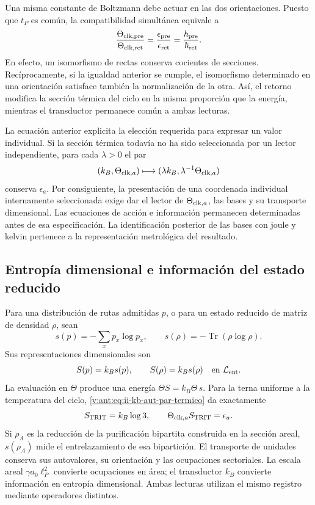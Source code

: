 Una misma constante de Boltzmann debe actuar en las dos orientaciones.
Puesto que \(t_P\) es común, la compatibilidad simultánea equivale a
\begin{equation}
 \frac{\Theta_{{\rm clk},{\rm pre}}}{\Theta_{{\rm clk},{\rm ret}}}
 =\frac{\epsilon_{\rm pre}}{\epsilon_{\rm ret}}
 =\frac{\hbar_{\rm pre}}{\hbar_{\rm ret}}.
 \label{v:ant:eq:ii-kb-aut-orientaciones}
\end{equation}
En efecto, un isomorfismo de rectas conserva cocientes de secciones.
Recíprocamente, si la igualdad anterior se cumple, el isomorfismo
determinado en una orientación satisface también la normalización de
la otra. Así, el retorno modifica la sección térmica del ciclo en la
misma proporción que la energía, mientras el transductor permanece
común a ambas lecturas.

La ecuación anterior explicita la elección requerida para expresar un
valor individual. Si la sección térmica todavía no ha sido seleccionada
por un lector independiente, para cada \(\lambda>0\) el par
\[
 (k_B,\Theta_{{\rm clk},a})
 \longmapsto(\lambda k_B,\lambda^{-1}\Theta_{{\rm clk},a})
\]
conserva \(\epsilon_a\). Por consiguiente, la presentación de una
coordenada individual internamente seleccionada exige dar el lector de
\(\Theta_{{\rm clk},a}\), las bases y su transporte dimensional.
Las ecuaciones de acción e información permanecen determinadas antes
de esa especificación. La identificación posterior de las bases con
joule y kelvin pertenece a la representación metrológica del resultado.

\subsection{Entropía dimensional e información del estado reducido}

Para una distribución de rutas admitidas \(p\), o para un estado
reducido de matriz de densidad \(\rho\), sean
\[
 s(p)=-\sum_xp_x\log p_x,\qquad
 s(\rho)=-\operatorname{Tr}(\rho\log\rho).
\]
Sus representaciones dimensionales son
\begin{equation}
 S(p)=k_Bs(p),\qquad S(\rho)=k_Bs(\rho)
 \quad\text{en }\mathcal L_{\rm ent}.
 \label{v:ant:eq:ii-kb-aut-entropia}
\end{equation}
La evaluación en \(\Theta\) produce una energía
\(\Theta S=k_B\Theta\,s\). Para la terna uniforme a la temperatura
del ciclo, \eqref{v:ant:eq:ii-kb-aut-par-termico} da exactamente
\[
 S_{\rm TRIT}=k_B\log3,\qquad
 \Theta_{{\rm clk},a}S_{\rm TRIT}=\epsilon_a.
\]
Si \(\rho_A\) es la reducción de la purificación bipartita
construida en la sección areal, \(s(\rho_A)\) mide el entrelazamiento
de esa bipartición. El transporte de unidades conserva sus
autovalores, su orientación y las ocupaciones sectoriales. La escala
areal \(\gamma a_0\ell_P^2\) convierte ocupaciones en área; el
transductor \(k_B\) convierte información en entropía dimensional.
Ambas lecturas utilizan el mismo registro mediante operadores distintos.

